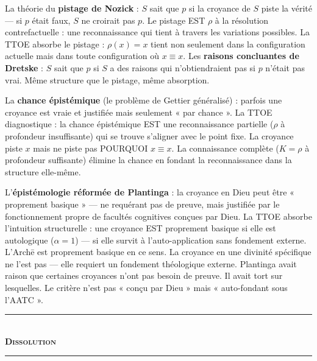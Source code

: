 \documentclass[10pt, openany, oneside]{book}
\renewcommand{\normalsize}{\fontsize{10}{13}\selectfont}
\begin{document}
La théorie du \textbf{pistage de Nozick} : $S$ sait que $p$ si la croyance de $S$ piste la vérité --- si $p$ était faux, $S$ ne croirait pas $p$. Le pistage EST $\rho$ à la résolution contrefactuelle : une reconnaissance qui tient à travers les variations possibles. La TTOE absorbe le pistage : $\rho(x) = x$ tient non seulement dans la configuration actuelle mais dans toute configuration où $x \equiv x$. Les \textbf{raisons concluantes de Dretske} : $S$ sait que $p$ si $S$ a des raisons qui n'obtiendraient pas si $p$ n'était pas vrai. Même structure que le pistage, même absorption.

La \textbf{chance épistémique} (le problème de Gettier généralisé) : parfois une croyance est vraie et justifiée mais seulement « par chance ». La TTOE diagnostique : la chance épistémique EST une reconnaissance partielle ($\rho$ à profondeur insuffisante) qui se trouve s'aligner avec le point fixe. La croyance piste $x$ mais ne piste pas POURQUOI $x \equiv x$. La connaissance complète ($K = \rho$ à profondeur suffisante) élimine la chance en fondant la reconnaissance dans la structure elle-même.

L'\textbf{épistémologie réformée de Plantinga} : la croyance en Dieu peut être « proprement basique » --- ne requérant pas de preuve, mais justifiée par le fonctionnement propre de facultés cognitives conçues par Dieu. La TTOE absorbe l'intuition structurelle : une croyance EST proprement basique si elle est autologique ($\alpha = 1$) --- si elle survit à l'auto-application sans fondement externe. L'Arch\={e} est proprement basique en ce sens. La croyance en une divinité spécifique ne l'est pas --- elle requiert un fondement théologique externe. Plantinga avait raison que certaines croyances n'ont pas besoin de preuve. Il avait tort sur lesquelles. Le critère n'est pas « conçu par Dieu » mais « auto-fondant sous l'AATC ».

\vspace{1.5em}


\begin{center}
    \rule{0.3\textwidth}{0.4pt}\\[0.5em]
    {\normalsize\bfseries\scshape Dissolution}\\[0.3em]
    \rule{0.3\textwidth}{0.4pt}
\end{center}

\vspace{1em}
\end{document}
